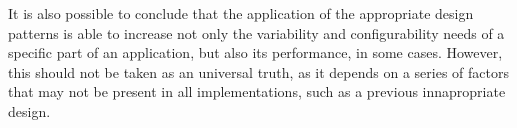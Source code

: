 \documentclass[9pt,a4paper]{extarticle}
\begin{document}
\begin{multicols}{2}
It is also possible to conclude that the application of the appropriate design patterns is able to increase not only the variability and configurability needs of a specific part of an application, but also its performance, in some cases. However, this should not be taken as an universal truth, as it depends on a series of factors that may not be present in all implementations, such as a previous innapropriate design.



\end{multicols}
\end{document}

